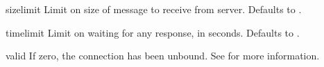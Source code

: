 
\begin{memberdesc}[int]{sizelimit}
    Limit on size of message to receive from server. 
    Defaults to .
\end{memberdesc}


\begin{memberdesc}[int]{timelimit}
    Limit on waiting for any response, in seconds. 
    Defaults to .
\end{memberdesc}


\begin{memberdesc}[int]{valid}
    If zero, the connection has been unbound. See  for
    more information.
\end{memberdesc}

